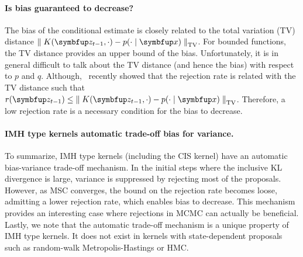 
\paragraph{Is bias guaranteed to decrease?}
The bias of the conditional estimate is closely related to the total variation (TV) distance \(\DTV{K(\vz_{t-1}, \cdot)}{p(\cdot\mid\vx)}\).
For bounded functions, the TV distance provides an upper bound of the bias.
Unfortunately, it is in general difficult to talk about the TV distance (and hence the bias) with respect to \(p\) and \(q\).
Although,~\citet{wang_exact_2020} recently showed that the rejection rate is related with the TV distance such that \(r(\vz_{t-1}) \leq \DTV{K(\vz_{t-1}, \cdot)}{p(\cdot\mid\vx)}\).
Therefore, a low rejection rate is a necessary condition for the bias to decrease.

\paragraph{IMH type kernels automatic trade-off bias for variance.}
To summarize, IMH type kernels (including the CIS kernel) have an automatic bias-variance trade-off mechanism.
In the initial steps where the inclusive KL divergence is large, variance is suppressed by rejecting most of the proposals.
However, as MSC converges, the bound on the rejection rate becomes loose, admitting a lower rejection rate, which enables bias to decrease.
This mechanism provides an interesting case where rejections in MCMC can actually be beneficial.
Lastly, we note that the automatic trade-off mechanism is a unique property of IMH type kernels.
It does not exist in kernels with state-dependent proposals such as random-walk Metropolis-Hastings or HMC.

